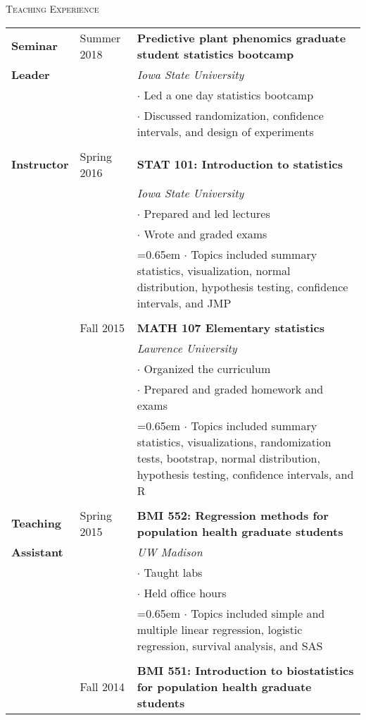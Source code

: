 \documentclass[10pt, oneside]{article}
\begin{document}
\noindent \textsc{Teaching Experience} \hrulefill
\begin{longtable}{p{1.4cm}p{2.1cm}p{13cm}}
\textbf{Seminar} & \hfill{Summer 2018} & \textbf{Predictive plant phenomics graduate student statistics bootcamp}\\
\textbf{Leader} & & \emph{Iowa State University}\\
& & $\cdot$ Led a one day statistics bootcamp\\
& & $\cdot$ Discussed randomization, confidence intervals, and design of experiments\\
\\
\textbf{Instructor} & \hfill{Spring 2016} & \textbf{STAT 101: Introduction to statistics}\\
& & \emph{Iowa State University}\\
& & $\cdot$ Prepared and led lectures\\
& & $\cdot$ Wrote and graded exams\\
& & \hangindent=0.65em \hangafter=1 $\cdot$ Topics included summary statistics, visualization, normal distribution, hypothesis testing, confidence intervals, and JMP\\
\\
& \hfill{Fall 2015} & \textbf{MATH 107 Elementary statistics}\\
& & \emph{Lawrence University}\\
& & $\cdot$ Organized the curriculum\\
& & $\cdot$ Prepared and graded homework and exams\\
& & \hangindent=0.65em \hangafter=1 $\cdot$ Topics included summary statistics, visualizations, randomization tests, bootstrap, normal distribution, hypothesis testing, confidence intervals, and R\\
\\
\textbf{Teaching} & \hfill{Spring 2015} & \textbf{BMI 552: Regression methods for population health graduate students}\\
\textbf{Assistant} & & \emph{UW Madison}\\
& & $\cdot$ Taught labs\\
& & $\cdot$ Held office hours\\
& & \hangindent=0.65em \hangafter=1 $\cdot$ Topics included simple and multiple linear regression, logistic regression, survival analysis, and SAS\\
\\
& \hfill{Fall 2014} & \textbf{BMI 551: Introduction to biostatistics for population health graduate students}\\

\end{longtable}
\end{document}
